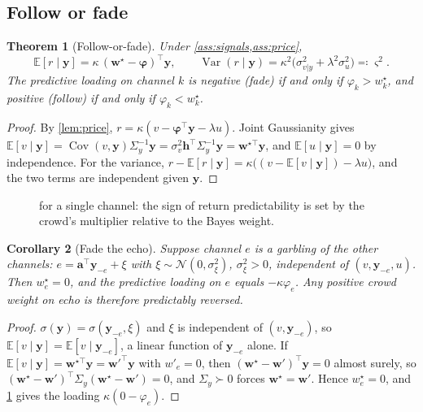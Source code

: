 \documentclass[11pt,a4paper]{article}
\theoremstyle{plain}
\newtheorem{theorem}{Theorem}[section]
\newtheorem{corollary}[theorem]{Corollary}
\theoremstyle{definition}
\theoremstyle{remark}
\newcommand{\E}{\mathbb{E}}
\newcommand{\N}{\mathcal{N}}
\newcommand{\w}{\bm{w}}
\newcommand{\y}{\bm{y}}
\newcommand{\h}{\bm{h}}
\newcommand{\bphi}{\bm{\varphi}}
\DeclareMathOperator{\Var}{Var}
\DeclareMathOperator{\Cov}{Cov}
\begin{document}
\subsection{Follow or fade}

\begin{theorem}[Follow-or-fade]\label{thm:followfade}
Under \cref{ass:signals,ass:price},
\[
  \E[r\mid\y]=\kappa\,(\w^\star-\bphi)^\top\y,\qquad \Var(r\mid\y)=\kappa^2\big(\sigma^2_{v|y}+\lambda^2\sigma_u^2\big)\eqqcolon\varsigma^2 .
\]
The predictive loading on channel $k$ is negative (\emph{fade}) if and only if $\varphi_k>w^\star_k$, and positive (\emph{follow}) if and only if $\varphi_k<w^\star_k$.
\end{theorem}
\begin{proof}
By \cref{lem:price}, $r=\kappa(v-\bphi^\top\y-\lambda u)$. Joint Gaussianity gives $\E[v\mid\y]=\Cov(v,\y)\Sigma_y^{-1}\y=\sigma_v^2\h^\top\Sigma_y^{-1}\y=\w^{\star\top}\y$, and $\E[u\mid\y]=0$ by independence. For the variance, $r-\E[r\mid\y]=\kappa\big((v-\E[v\mid\y])-\lambda u\big)$, and the two terms are independent given $\y$.
\end{proof}

\begin{figure}[ht]
\centering
{}
\caption{ for a single channel: the sign of return predictability is set by the crowd's multiplier relative to the Bayes weight.}
\label{fig:phi}
\end{figure}

\begin{corollary}[Fade the echo]\label{cor:echo}
Suppose channel $e$ is a garbling of the other channels: $e=\bm a^\top\y_{-e}+\xi$ with $\xi\sim\N(0,\sigma_\xi^2)$, $\sigma_\xi^2>0$, independent of $(v,\y_{-e},u)$. Then $w^\star_e=0$, and the predictive loading on $e$ equals $-\kappa\varphi_e$. Any positive crowd weight on echo is therefore predictably reversed.
\end{corollary}
\begin{proof}
$\sigma(\y)=\sigma(\y_{-e},\xi)$ and $\xi$ is independent of $(v,\y_{-e})$, so $\E[v\mid\y]=\E[v\mid\y_{-e}]$, a linear function of $\y_{-e}$ alone. If $\E[v\mid\y]=\w^{\star\top}\y=\w'^{\top}\y$ with $w'_e=0$, then $(\w^\star-\w')^\top\y=0$ almost surely, so $(\w^\star-\w')^\top\Sigma_y(\w^\star-\w')=0$, and $\Sigma_y\succ0$ forces $\w^\star=\w'$. Hence $w^\star_e=0$, and \cref{thm:followfade} gives the loading $\kappa(0-\varphi_e)$.
\end{proof}
\end{document}
